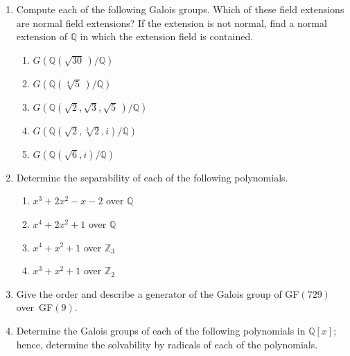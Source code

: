  
{\small
\begin{enumerate}
 
 
\item
Compute each of the following Galois groups. Which of these field
extensions are normal field extensions? If the extension is not
normal, find a normal extension of ${\mathbb Q}$ in which the extension
field is contained.
\begin{multicols}{2}
\begin{enumerate}

\item 
$G({\mathbb Q}(\sqrt{30}\, ) / {\mathbb Q})$

\item 
$G({\mathbb Q}(\sqrt[4]{5}\, ) / {\mathbb Q})$

\item 
$G( {\mathbb Q}(\sqrt{2}, \sqrt{3}, \sqrt{5}\, )/ {\mathbb Q} )$

\item 
$G({\mathbb Q}(\sqrt{2}, \sqrt[3]{2}, i) / {\mathbb Q})$

\item 
$G({\mathbb Q}(\sqrt{6}, i) / {\mathbb Q})$


\end{enumerate}

\end{multicols}
 

 
 
\item
Determine the separability of each of the following polynomials.
\begin{multicols}{2}
\begin{enumerate}

\item 
$x^3 + 2 x^2 - x - 2$ over ${\mathbb Q}$

\item 
$x^4 + 2 x^2 + 1$ over ${\mathbb Q}$

\item 
$x^4 + x^2 + 1$ over ${\mathbb Z}_3$

\item 
$x^3 +x^2 + 1$ over ${\mathbb Z}_2$

\end{enumerate}
\end{multicols}
 

\item
Give the order and describe a generator of the Galois group of
GF$(729)$ over~GF$(9)$.

 
\item
Determine the Galois groups of each of the following polynomials in
${\mathbb Q}[x]$; hence, determine the solvability by radicals of each 
of the polynomials.
\begin{multicols}{2}
\begin{enumerate}


\end{enumerate}
\end{multicols}
\end{enumerate}}
